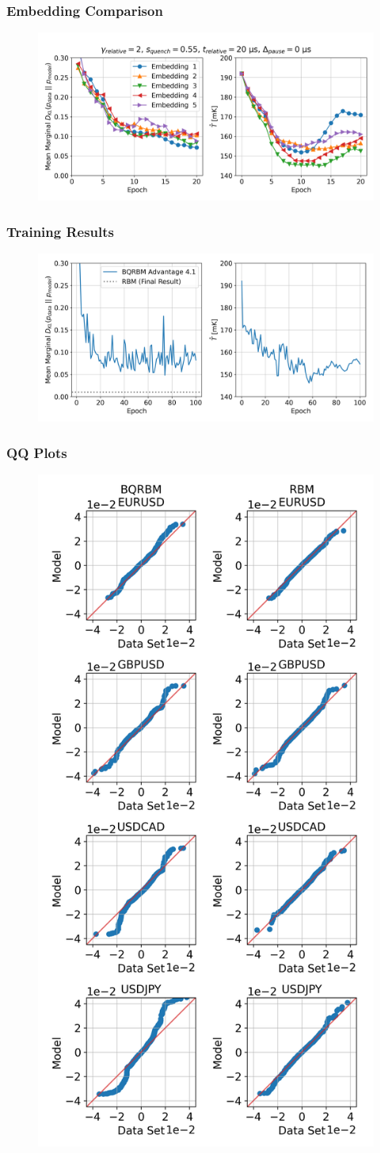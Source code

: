 \documentclass{beamer}
\begin{document}
\begin{frame}
    \frametitle{Embedding Comparison}
    \begin{figure}
        \includegraphics[width=1\linewidth]{qbm/log_returns/embedding_comparison.png}
    \end{figure}
\end{frame}

\begin{frame}
    \frametitle{Training Results}
    \begin{figure}
        \includegraphics[width=1\linewidth]{qbm/log_returns/full_run.png}
    \end{figure}
\end{frame}

\begin{frame}
    \frametitle{QQ Plots}
    \begin{figure}
        \includegraphics[width=0.3\linewidth]{qbm/log_returns/qq.png}
    \end{figure}
\end{frame}
\end{document}
